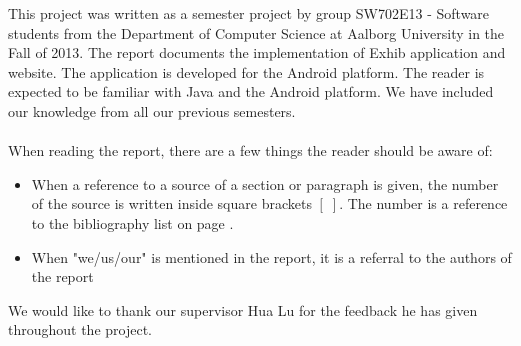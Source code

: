 This project was written as a semester project by group SW702E13 - Software students from the Department of Computer Science at Aalborg University in the Fall of 2013. The report documents the implementation of Exhib application and website. The application is developed for the Android platform. The reader is expected to be familiar with Java and the Android platform. We have included our knowledge from all our previous semesters.
\\\\
When reading the report, there are a few things the reader should be aware of:
\begin{itemize}
\item When a reference to a source of a section or paragraph is given, the number of the source is written inside square brackets $[\;]$. The number is a reference to the bibliography list on page \pageref{chap:bib}.
\item When "we/us/our" is mentioned in the report, it is a referral to the authors of the report
\end{itemize}
We would like to thank our supervisor Hua Lu for the feedback he has given throughout the project.
